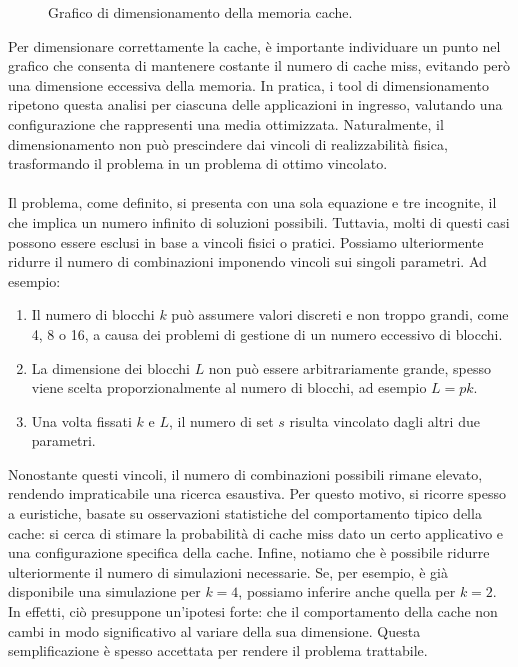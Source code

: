 \begin{figure}[!h]
\begin{center}
\end{center}
\caption{Grafico di dimensionamento della memoria cache.}
\label{fig:graph_cache}
\end{figure}

Per dimensionare correttamente la cache, è importante individuare un punto nel grafico che consenta di mantenere costante il numero di cache miss, evitando però una dimensione eccessiva della memoria. In pratica, i tool di dimensionamento ripetono questa analisi per ciascuna delle applicazioni in ingresso, valutando una configurazione che rappresenti una media ottimizzata. Naturalmente, il dimensionamento non può prescindere dai vincoli di realizzabilità fisica, trasformando il problema in un problema di ottimo vincolato.
\\
\\
Il problema, come definito, si presenta con una sola equazione e tre incognite, il che implica un numero infinito di soluzioni possibili. Tuttavia, molti di questi casi possono essere esclusi in base a vincoli fisici o pratici. Possiamo ulteriormente ridurre il numero di combinazioni imponendo vincoli sui singoli parametri. Ad esempio:
\begin{enumerate}
    \item Il numero di blocchi \(k\) può assumere valori discreti e non troppo grandi, come 4, 8 o 16, a causa dei problemi di gestione di un numero eccessivo di blocchi.
    \item La dimensione dei blocchi \(L\) non può essere arbitrariamente grande, spesso viene scelta proporzionalmente al numero di blocchi, ad esempio \(L=pk\).
    \item Una volta fissati \(k\) e \(L\), il numero di set \(s\) risulta vincolato dagli altri due parametri.
\end{enumerate}

Nonostante questi vincoli, il numero di combinazioni possibili rimane elevato, rendendo impraticabile una ricerca esaustiva. Per questo motivo, si ricorre spesso a euristiche, basate su osservazioni statistiche del comportamento tipico della cache: si cerca di stimare la probabilità di cache miss dato un certo applicativo e una configurazione specifica della cache. Infine, notiamo che è possibile ridurre ulteriormente il numero di simulazioni necessarie. Se, per esempio, è già disponibile una simulazione per \(k=4\), possiamo inferire anche quella per \( k=2\). In effetti, ciò presuppone un'ipotesi forte: che il comportamento della cache non cambi in modo significativo al variare della sua dimensione. Questa semplificazione è spesso accettata per rendere il problema trattabile.